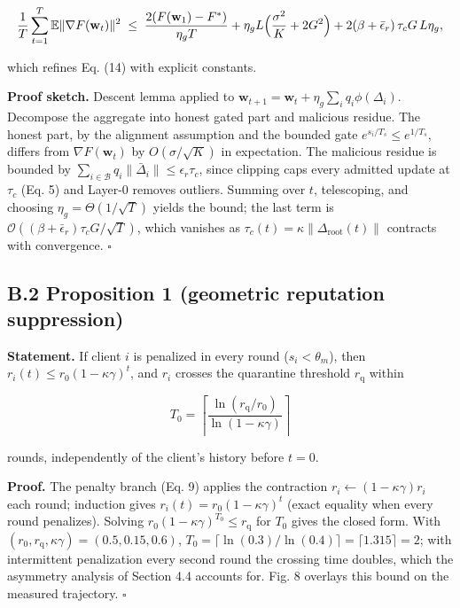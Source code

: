 \documentclass[cmc,article,submit,moreauthors,pdftex]{Definitions/tsp}
\begin{document}
\[
\frac{1}{T}\sum_{t=1}^{T} \mathbb{E}\|\nabla F(\mathbf{w}_t)\|^2 \;\le\; \frac{2(F(\mathbf{w}_1) - F^*)}{\eta_g T} + \eta_g L\Bigl(\frac{\sigma^2}{K} + 2G^2\Bigr) + 2(\beta + \bar\epsilon_r)\,\tau_c G \, L \eta_g,
\]

which refines Eq. (14) with explicit constants.

\textbf{Proof sketch.} Descent lemma applied to $\mathbf{w}_{t+1} = \mathbf{w}_t + \eta_g \sum_i q_i \phi(\Delta_i)$. Decompose the aggregate into honest gated part and malicious residue. The honest part, by the alignment assumption and the bounded gate $e^{s_i/T_s} \le e^{1/T_s}$, differs from $\nabla F(\mathbf{w}_t)$ by $O(\sigma/\sqrt{K})$ in expectation. The malicious residue is bounded by $\sum_{i\in\mathcal{B}} q_i \|\bar\Delta_i\| \le \epsilon_r \tau_c$, since clipping caps every admitted update at $\tau_c$ (Eq. 5) and Layer-0 removes outliers. Summing over $t$, telescoping, and choosing $\eta_g = \Theta(1/\sqrt{T})$ yields the bound; the last term is $\mathcal{O}((\beta + \bar\epsilon_r)\tau_c G/\sqrt{T})$, which vanishes as $\tau_c(t) = \kappa\|\Delta_{\mathrm{root}}(t)\|$ contracts with convergence. $\square$

\subsection*{B.2 Proposition 1 (geometric reputation suppression)}

\textbf{Statement.} If client $i$ is penalized in every round ($s_i < \theta_m$), then $r_i(t) \le r_0 (1-\kappa\gamma)^t$, and $r_i$ crosses the quarantine threshold $r_{\mathrm{q}}$ within

\[
T_0 = \left\lceil \frac{\ln(r_{\mathrm{q}}/r_0)}{\ln(1-\kappa\gamma)} \right\rceil
\]

rounds, independently of the client's history before $t=0$.

\textbf{Proof.} The penalty branch (Eq. 9) applies the contraction $r_i \leftarrow (1-\kappa\gamma) r_i$ each round; induction gives $r_i(t) = r_0(1-\kappa\gamma)^t$ (exact equality when every round penalizes). Solving $r_0(1-\kappa\gamma)^{T_0} \le r_{\mathrm{q}}$ for $T_0$ gives the closed form. With $(r_0, r_{\mathrm{q}}, \kappa\gamma) = (0.5, 0.15, 0.6)$, $T_0 = \lceil \ln(0.3)/\ln(0.4) \rceil = \lceil 1.315 \rceil = 2$; with intermittent penalization every second round the crossing time doubles, which the asymmetry analysis of Section 4.4 accounts for. Fig. 8 overlays this bound on the measured trajectory. $\square$
\end{document}
